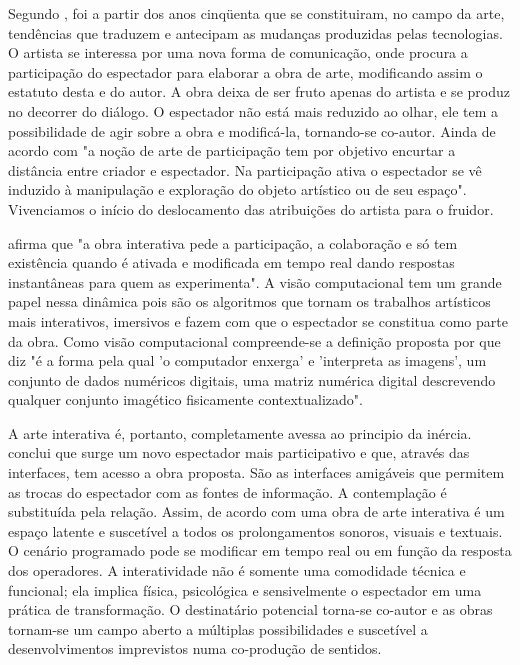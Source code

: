 Segundo , foi a partir dos anos cinqüenta que se constituiram, no campo da arte, tendências que traduzem e antecipam as mudanças produzidas pelas tecnologias. O artista se interessa por uma nova forma de comunicação, onde procura a participação do espectador para elaborar a obra de arte, modificando assim o estatuto desta e do autor. A obra deixa de ser fruto apenas do artista e se produz no decorrer do diálogo. O espectador não está mais reduzido ao olhar, ele tem a possibilidade de agir sobre a obra e modificá-la, tornando-se co-autor. Ainda de acordo com  "a noção de arte de participação tem por objetivo encurtar a distância entre criador e espectador. Na participação ativa o espectador se vê induzido à manipulação e exploração do objeto artístico ou de seu espaço". Vivenciamos o início do deslocamento das atribuições do artista para o fruidor. 

 afirma que "a obra interativa pede a participação, a colaboração e só tem existência quando é ativada e modificada em tempo real dando respostas instantâneas para quem as experimenta". A visão computacional tem um grande papel nessa dinâmica pois são os algoritmos que tornam os trabalhos artísticos mais interativos, imersivos e fazem com que o espectador se constitua como parte da obra. Como visão computacional compreende-se a definição proposta por  que diz "é a forma pela qual 'o computador enxerga' e 'interpreta as imagens', um conjunto de dados numéricos digitais, uma matriz numérica digital descrevendo qualquer conjunto imagético fisicamente contextualizado".

A arte interativa é, portanto, completamente avessa ao principio da inércia.  conclui que surge um novo espectador mais participativo e que, através das interfaces, tem acesso a obra proposta. São as interfaces amigáveis que permitem as trocas do espectador com as fontes de informação. A contemplação é substituída pela relação. Assim, de acordo com  uma obra de arte interativa é um espaço latente e suscetível a todos os prolongamentos sonoros, visuais e textuais. O cenário programado pode se modificar em tempo real ou em função da resposta dos operadores. A interatividade não é somente uma comodidade técnica e funcional; ela implica física, psicológica e sensivelmente o espectador em uma prática de transformação. O destinatário potencial torna-se co-autor e as obras tornam-se um campo aberto a múltiplas possibilidades e suscetível a desenvolvimentos imprevistos numa co-produção de sentidos.	


